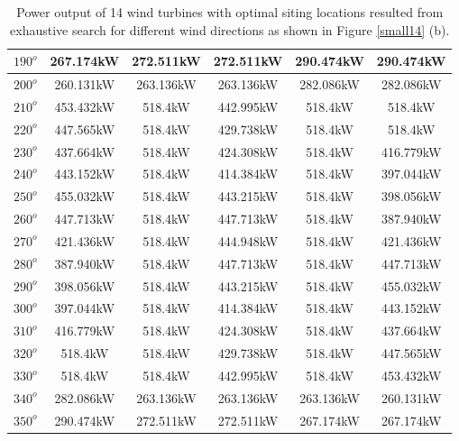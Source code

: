 \begin{table}[H]
\begin{tabular}{|c|c|c|c|c|c|}
        		$190^o$	& 267.174kW	& 272.511kW	& 272.511kW	& 290.474kW	& 290.474kW	\\ \hline
        		$200^o$	& 260.131kW	& 263.136kW	& 263.136kW	& 282.086kW	& 282.086kW	\\ \hline
        		$210^o$	& 453.432kW	& 518.4kW	& 442.995kW	& 518.4kW	& 518.4kW	\\ \hline
        		$220^o$	& 447.565kW	& 518.4kW	& 429.738kW	& 518.4kW	& 518.4kW	\\ \hline
        		$230^o$	& 437.664kW	& 518.4kW	& 424.308kW	& 518.4kW	& 416.779kW	\\ \hline
        		$240^o$	& 443.152kW	& 518.4kW	& 414.384kW	& 518.4kW	& 397.044kW	\\ \hline
        		$250^o$	& 455.032kW	& 518.4kW	& 443.215kW	& 518.4kW	& 398.056kW	\\ \hline
        		$260^o$	& 447.713kW	& 518.4kW	& 447.713kW	& 518.4kW	& 387.940kW	\\ \hline
        		$270^o$	& 421.436kW	& 518.4kW	& 444.948kW	& 518.4kW	& 421.436kW	\\ \hline
        		$280^o$	& 387.940kW	& 518.4kW	& 447.713kW	& 518.4kW	& 447.713kW	\\ \hline
        		$290^o$	& 398.056kW	& 518.4kW	& 443.215kW	& 518.4kW	& 455.032kW	\\ \hline
        		$300^o$	& 397.044kW	& 518.4kW	& 414.384kW	& 518.4kW	& 443.152kW	\\ \hline
        		$310^o$	& 416.779kW	& 518.4kW	& 424.308kW	& 518.4kW	& 437.664kW	\\ \hline
        		$320^o$	& 518.4kW	& 518.4kW	& 429.738kW	& 518.4kW	& 447.565kW	\\ \hline
        		$330^o$	& 518.4kW	& 518.4kW	& 442.995kW	& 518.4kW	& 453.432kW	\\ \hline
        		$340^o$	& 282.086kW	& 263.136kW	& 263.136kW	& 263.136kW	& 260.131kW	\\ \hline
        		$350^o$	& 290.474kW	& 272.511kW	& 272.511kW	& 267.174kW	& 267.174kW	\\ \hline
        	\end{tabular}
        	\caption{Power output of 14 wind turbines with optimal siting locations resulted from exhaustive search for different wind directions as shown in Figure \ref{small14} (b).}
        	\label{table14b}
        \end{table}
